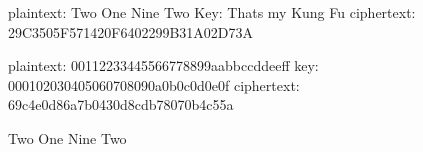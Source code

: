 plaintext: Two One Nine Two
Key: Thats my Kung Fu
ciphertext: 29C3505F571420F6402299B31A02D73A

plaintext: 00112233445566778899aabbccddeeff
key: 000102030405060708090a0b0c0d0e0f
ciphertext: 69c4e0d86a7b0430d8cdb78070b4c55a

Two One Nine Two